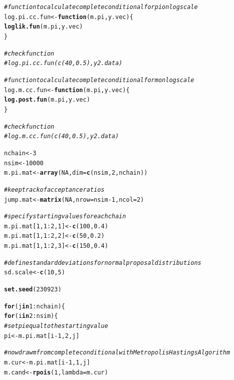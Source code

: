 \documentclass[12pt]{article}\usepackage[]{graphicx}\usepackage[]{color}
\makeatletter
\newcommand{\hlnum}[1]{\textcolor[rgb]{0.686,0.059,0.569}{#1}}%
\newcommand{\hlcom}[1]{\textcolor[rgb]{0.678,0.584,0.686}{\textit{#1}}}%
\newcommand{\hlopt}[1]{\textcolor[rgb]{0,0,0}{#1}}%
\newcommand{\hlstd}[1]{\textcolor[rgb]{0.345,0.345,0.345}{#1}}%
\newcommand{\hlkwa}[1]{\textcolor[rgb]{0.161,0.373,0.58}{\textbf{#1}}}%
\newcommand{\hlkwb}[1]{\textcolor[rgb]{0.69,0.353,0.396}{#1}}%
\newcommand{\hlkwc}[1]{\textcolor[rgb]{0.333,0.667,0.333}{#1}}%
\newcommand{\hlkwd}[1]{\textcolor[rgb]{0.737,0.353,0.396}{\textbf{#1}}}%
\newenvironment{kframe}{%
 \def\at@end@of@kframe{}%
 \ifinner\ifhmode%
  \def\at@end@of@kframe{\end{minipage}}%
  \begin{minipage}{\columnwidth}%
 \fi\fi%
 \def\FrameCommand##1{\hskip\@totalleftmargin \hskip-\fboxsep
 \colorbox{shadecolor}{##1}\hskip-\fboxsep
     \hskip-\linewidth \hskip-\@totalleftmargin \hskip\columnwidth}%
 \MakeFramed {\advance\hsize-\width
   \@totalleftmargin\z@ \linewidth\hsize
   \@setminipage}}%
 {\par\unskip\endMakeFramed%
 \at@end@of@kframe}
\newenvironment{knitrout}{}{} %
\makeatother
\begin{document}
\begin{enumerate}
\begin{enumerate}
\begin{enumerate}
\begin{knitrout}
\begin{kframe}
\begin{alltt}
\hlcom{#function to calculate complete conditional for pi on log scale}
\hlstd{log.pi.cc.fun} \hlkwb{<-} \hlkwa{function}\hlstd{(}\hlkwc{m.pi}\hlstd{,} \hlkwc{y.vec}\hlstd{)\{}
  \hlkwd{loglik.fun}\hlstd{(m.pi, y.vec)}
\hlstd{\}}

\hlcom{#check function}
\hlcom{#log.pi.cc.fun(c(40, 0.5), y2.data)}

\hlcom{#function to calculate complete conditional for m on log scale}
\hlstd{log.m.cc.fun} \hlkwb{<-} \hlkwa{function}\hlstd{(}\hlkwc{m.pi}\hlstd{,} \hlkwc{y.vec}\hlstd{)\{}
  \hlkwd{log.post.fun}\hlstd{(m.pi, y.vec)}
\hlstd{\}}

\hlcom{#check function}
\hlcom{#log.m.cc.fun(c(40, 0.5), y2.data)}

\hlstd{nchain} \hlkwb{<-} \hlnum{3}
\hlstd{nsim} \hlkwb{<-} \hlnum{10000}
\hlstd{m.pi.mat} \hlkwb{<-} \hlkwd{array}\hlstd{(}\hlnum{NA}\hlstd{,} \hlkwc{dim}\hlstd{=}\hlkwd{c}\hlstd{(nsim,} \hlnum{2}\hlstd{, nchain))}

\hlcom{#keep track of acceptance ratios}
\hlstd{jump.mat} \hlkwb{<-} \hlkwd{matrix}\hlstd{(}\hlnum{NA}\hlstd{,} \hlkwc{nrow}\hlstd{=nsim}\hlopt{-}\hlnum{1}\hlstd{,} \hlkwc{ncol}\hlstd{=}\hlnum{2}\hlstd{)}

\hlcom{#specify starting values for each chain}
\hlstd{m.pi.mat[}\hlnum{1}\hlstd{,} \hlnum{1}\hlopt{:}\hlnum{2}\hlstd{,} \hlnum{1}\hlstd{]} \hlkwb{<-} \hlkwd{c}\hlstd{(}\hlnum{100}\hlstd{,} \hlnum{0.4}\hlstd{)}
\hlstd{m.pi.mat[}\hlnum{1}\hlstd{,} \hlnum{1}\hlopt{:}\hlnum{2}\hlstd{,} \hlnum{2}\hlstd{]} \hlkwb{<-} \hlkwd{c}\hlstd{(}\hlnum{50}\hlstd{,} \hlnum{0.2}\hlstd{)}
\hlstd{m.pi.mat[}\hlnum{1}\hlstd{,} \hlnum{1}\hlopt{:}\hlnum{2}\hlstd{,} \hlnum{3}\hlstd{]} \hlkwb{<-} \hlkwd{c}\hlstd{(}\hlnum{150}\hlstd{,} \hlnum{0.4}\hlstd{)}

\hlcom{#define standard deviations for normal proposal distributions}
\hlstd{sd.scale} \hlkwb{<-} \hlkwd{c}\hlstd{(}\hlnum{10}\hlstd{,} \hlnum{5}\hlstd{)}

\hlkwd{set.seed}\hlstd{(}\hlnum{230923}\hlstd{)}

\hlkwa{for} \hlstd{(j} \hlkwa{in} \hlnum{1}\hlopt{:}\hlstd{nchain) \{}
  \hlkwa{for} \hlstd{(i} \hlkwa{in} \hlnum{2}\hlopt{:}\hlstd{nsim) \{}
    \hlcom{#set pi equal to the starting value}
    \hlstd{pi} \hlkwb{<-} \hlstd{m.pi.mat[i}\hlopt{-}\hlnum{1}\hlstd{,} \hlnum{2}\hlstd{, j]}

    \hlcom{#now draw m from complete conditional with Metropolis Hastings Algorithm}
    \hlstd{m.cur} \hlkwb{<-} \hlstd{m.pi.mat[i}\hlopt{-}\hlnum{1}\hlstd{,} \hlnum{1}\hlstd{, j]}
    \hlstd{m.cand} \hlkwb{<-} \hlkwd{rpois}\hlstd{(}\hlnum{1}\hlstd{,} \hlkwc{lambda}\hlstd{=m.cur)}


\end{alltt}
\end{kframe}
\end{knitrout}
\end{enumerate}
\end{enumerate}
\end{enumerate}
\end{document}
